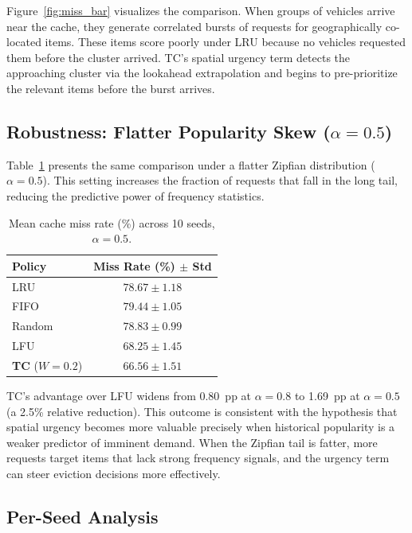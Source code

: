 \documentclass[preprint,12pt]{elsarticle}
\begin{document}
	Figure~\ref{fig:miss_bar} visualizes the comparison. When groups of vehicles arrive near the cache, they generate correlated bursts of requests for geographically co-located items. These items score poorly under LRU because no vehicles requested them before the cluster arrived. TC's spatial urgency term detects the approaching cluster via the lookahead extrapolation and begins to pre-prioritize the relevant items before the burst arrives.
	
	\subsection{Robustness: Flatter Popularity Skew ($\alpha = 0.5$)}
	\label{sec:skew}
	
	Table~\ref{tab:skew} presents the same comparison under a flatter Zipfian distribution ($\alpha = 0.5$). This setting increases the fraction of requests that fall in the long tail, reducing the predictive power of frequency statistics.
	
	\begin{table}[t]
		\centering
		\renewcommand{\arraystretch}{1.1}
		\caption{Mean cache miss rate (\%) across 10 seeds, $\alpha = 0.5$.}
		\label{tab:skew}
		\begin{tabular}{lc}
			\toprule
			\textbf{Policy} & \textbf{Miss Rate (\%) $\pm$ Std} \\
			\midrule
			LRU & $78.67 \pm 1.18$ \\
			FIFO & $79.44 \pm 1.05$ \\
			Random & $78.83 \pm 0.99$ \\
			LFU & $68.25 \pm 1.45$ \\
			\textbf{TC} ($W=0.2$) & $\mathbf{66.56 \pm 1.51}$ \\
			\bottomrule
		\end{tabular}
	\end{table}
	
	TC's advantage over LFU widens from 0.80~pp at $\alpha = 0.8$ to 1.69~pp at $\alpha = 0.5$ (a 2.5\% relative reduction). This outcome is consistent with the hypothesis that spatial urgency becomes more valuable precisely when historical popularity is a weaker predictor of imminent demand. When the Zipfian tail is fatter, more requests target items that lack strong frequency signals, and the urgency term can steer eviction decisions more effectively.
	
	\subsection{Per-Seed Analysis}
	\label{sec:seed}
	
\end{document}
